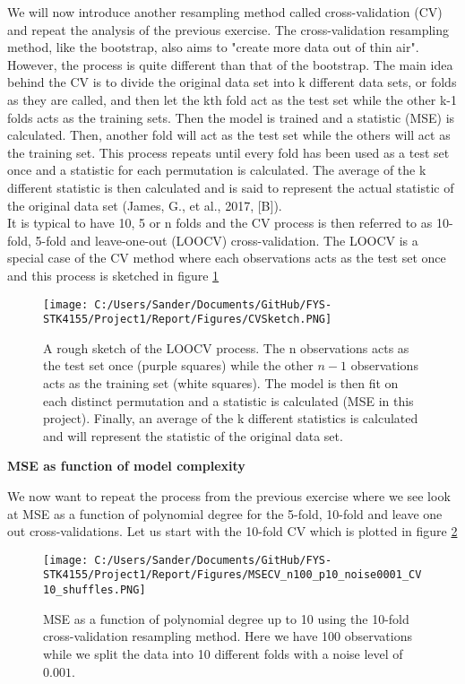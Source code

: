 \documentclass[12pt,a4paper]{article}
\begin{document}
\noindent We will now introduce another resampling method called cross-validation (CV) and repeat the analysis of the previous exercise. The cross-validation resampling method, like the bootstrap, also aims to "create more data out of thin air". However, the process is quite different than that of the bootstrap. The main idea behind the CV is to divide the original data set into k different data sets, or folds as they are called, and then let the kth fold act as the test set while the other k-1 folds acts as the training sets. Then the model is trained and a statistic (MSE) is calculated. Then, another fold will act as the test set while the others will act as the training set. This process repeats until every fold has been used as a test set once and a statistic for each permutation is calculated. The average of the k different statistic is then calculated and is said to represent the actual statistic of the original data set (James, G., et al., 2017, [B]). 
\\
It is typical to have 10, 5 or n folds and the CV process is then referred to as 10-fold, 5-fold and leave-one-out (LOOCV) cross-validation. The LOOCV is a special case of the CV method where each observations acts as the test set once and this process is sketched in figure \ref{fig:CVsketch}

\begin{figure}[H]
\centering
\texttt{[image: C:/Users/Sander/Documents/GitHub/FYS-STK4155/Project1/Report/Figures/CVSketch.PNG]}
\caption{\label{fig:CVsketch} A rough sketch of the LOOCV process. The n observations acts as the test set once (purple squares) while the other $n-1$ observations acts as the training set (white squares). The model is then fit on each distinct permutation and a statistic is calculated (MSE in this project). Finally, an average of the k different statistics is calculated and will represent the statistic of the original data set.}
\end{figure}

\begin{center}
\large{\textbf{MSE as function of model complexity}}
\end{center}

\noindent We now want to repeat the process from the previous exercise where we see look at MSE as a function of polynomial degree for the 5-fold, 10-fold and leave one out cross-validations. Let us start with the 10-fold CV which is plotted in figure \ref{fig:MSECV1}

\begin{figure}[H]
\centering
\texttt{[image: C:/Users/Sander/Documents/GitHub/FYS-STK4155/Project1/Report/Figures/MSECV\_n100\_p10\_noise0001\_CV10\_shuffles.PNG]}
\caption{\label{fig:MSECV1} MSE as a function of polynomial degree up to 10 using the 10-fold cross-validation resampling method. Here we have 100 observations while we split the data into 10 different folds with a noise level of $0.001$.}
\end{figure}
\end{document}
